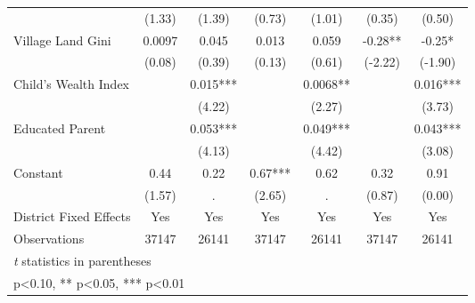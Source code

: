 \begin{sidewaystable}[htbp]
\begin{tabular}{l*{6}{c}}
                &   (1.33)   &   (1.39)   &   (0.73)   &   (1.01)   &   (0.35)   &   (0.50)   \\
Village Land Gini&   0.0097   &    0.045   &    0.013   &    0.059   &    -0.28** &    -0.25*  \\
                &   (0.08)   &   (0.39)   &   (0.13)   &   (0.61)   &  (-2.22)   &  (-1.90)   \\
Child's Wealth Index&            &    0.015***&            &   0.0068** &            &    0.016***\\
                &            &   (4.22)   &            &   (2.27)   &            &   (3.73)   \\
Educated Parent &            &    0.053***&            &    0.049***&            &    0.043***\\
                &            &   (4.13)   &            &   (4.42)   &            &   (3.08)   \\
Constant        &     0.44   &     0.22   &     0.67***&     0.62   &     0.32   &     0.91   \\
                &   (1.57)   &        .   &   (2.65)   &        .   &   (0.87)   &   (0.00)   \\
District Fixed Effects&      Yes   &      Yes   &      Yes   &      Yes   &      Yes   &      Yes   \\
\midrule
Observations    &    37147   &    26141   &    37147   &    26141   &    37147   &    26141   \\
\bottomrule
\multicolumn{7}{l}{\footnotesize \textit{t} statistics in parentheses}\\
\multicolumn{7}{l}{\footnotesize * p<0.10, ** p<0.05, *** p<0.01}\\
\end{tabular}
\end{sidewaystable}
